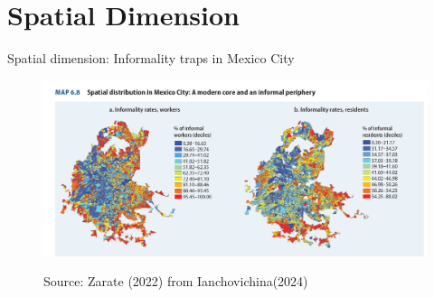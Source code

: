 \documentclass{beamer}
\begin{document}
 \section{}
 \section{Spatial Dimension}
 \begin{frame}{Spatial dimension: Informality traps in Mexico City}
     \begin{figure}[!htb]
        \justifying
                \includegraphics[width=0.8\linewidth]{latex/figures/informality trap mexico.png}
        \label{fig:Evolution_selfemployedSS}
        \centering
        
        \footnotesize{Source: Zarate (2022) from  Ianchovichina(2024)}
 \end{figure}
 \end{frame}
\end{document}
